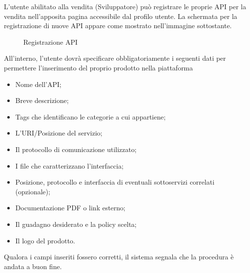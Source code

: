 L'utente abilitato alla vendita (Sviluppatore) può  registrare le proprie API per la vendita nell'apposita pagina accessibile dal profilo utente. La schermata per la registrazione di nuove API appare come mostrato nell'immagine sottostante.

\label{Registrazione API}
\begin{figure}[H]
	\centering
	\caption{Registrazione API}
\end{figure}

All'interno, l'utente dovrà specificare obbligatoriamente i seguenti dati per permettere l'inserimento del proprio prodotto nella piattaforma

\begin{itemize}
	\item Nome dell'API;
	\item Breve descrizione;
	\item Tags che identificano le categorie a cui appartiene;
	\item L'URI/Posizione del servizio;
	\item Il protocollo di comunicazione utilizzato;
	\item I file che caratterizzano l'interfaccia;
	\item Posizione, protocollo e interfaccia di eventuali sottoservizi correlati (opzionale);
	\item Documentazione PDF o link esterno;
	\item Il guadagno desiderato e la policy scelta;
	\item Il logo del prodotto.
\end{itemize}

Qualora i campi inseriti fossero corretti, il sistema segnala che la procedura è andata a buon fine.

